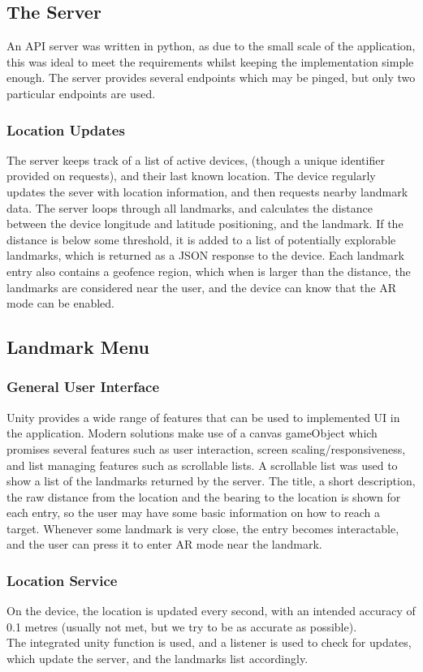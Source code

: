 
\subsection{The Server}
An API server was written in python, as due to the small scale of the application, this was ideal to meet the requirements whilst keeping the 
implementation simple enough. The server provides several endpoints which may be pinged, but only two particular endpoints are used. 
\subsubsection{Location Updates}
The server keeps track of a list of active devices, (though a unique identifier provided on requests), and their last known location.
The device regularly updates the sever with location information, and then requests nearby landmark data. 
The server loops through all landmarks, and calculates the distance between the device longitude and latitude positioning, and the landmark.
If the distance is below some threshold, it is added to a list of potentially explorable landmarks, which is returned as a JSON response 
to the device. Each landmark entry also contains a geofence region, which when is larger than the distance, the landmarks are considered near 
the user, and the device can know that the AR mode can be enabled.


\subsection{Landmark Menu}
\subsubsection{General User Interface}
Unity provides a wide range of features that can be used to implemented UI in the application. 
Modern solutions make use of a canvas gameObject which promises several features such as user interaction, screen scaling/responsiveness, and 
list managing features such as scrollable lists.
\noindent
A scrollable list was used to show a list of the landmarks returned by the server. The title,
a short description, the raw distance from the location and the bearing to the location is shown for each entry,
 so the user may have some basic information on how to reach a target.
  Whenever some landmark is very close, the entry becomes interactable, and the user can press it 
to enter AR mode near the landmark. 

\subsubsection{Location Service}
On the device, the location is updated every second, with an intended accuracy of 0.1 metres 
(usually not met, but we try to be as accurate as possible).\\
The integrated unity function is used, and a listener is used to check for updates, which update the server,
and the landmarks list accordingly.


